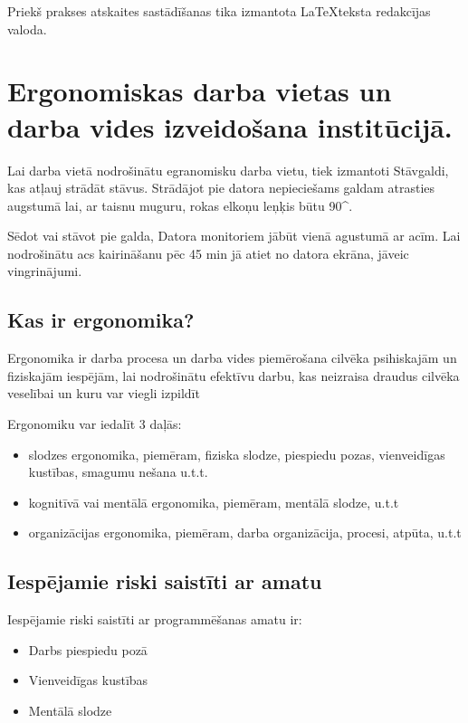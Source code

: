 \documentclass[12pt]{article}
\begin{document}
	Priekš prakses atskaites sastādīšanas tika izmantota \LaTeX\space teksta redakcījas valoda. 
	\pagebreak
	
	
	\section{Ergonomiskas darba vietas un darba vides izveidošana institūcijā.}
	
	Lai darba vietā nodrošinātu egranomisku darba vietu, tiek izmantoti Stāvgaldi, kas atļauj strādāt stāvus. Strādājot pie datora nepieciešams galdam atrasties augstumā lai, ar taisnu muguru, rokas elkoņu leņķis būtu 90^{\circ}.
	
	Sēdot vai stāvot pie galda, Datora monitoriem jābūt vienā agustumā ar acīm. Lai nodrošinātu acs kairināšanu pēc 45 min jā atiet no datora ekrāna, jāveic vingrinājumi.
	
	\subsection{Kas ir ergonomika?}
	Ergonomika ir darba procesa un darba vides piemērošana cilvēka psihiskajām un fiziskajām iespējām, lai
nodrošinātu efektīvu darbu, kas neizraisa draudus cilvēka veselībai un kuru var viegli izpildīt
	
	Ergonomiku var iedalīt 3 daļās:
	\begin{itemize}
		\item slodzes ergonomika, piemēram, fiziska slodze, piespiedu pozas, vienveidīgas kustības, smagumu
nešana u.t.t.
		\item kognitīvā vai mentālā ergonomika, piemēram, mentālā slodze, u.t.t
		\item organizācijas ergonomika, piemēram, darba organizācija, procesi, atpūta, u.t.t
	\end{itemize}
	
	\subsection{Iespējamie riski saistīti ar amatu}
	Iespējamie riski saistīti ar programmēšanas amatu ir:
	\begin{itemize}
		\item Darbs piespiedu pozā
		\item Vienveidīgas kustības
		\item Mentālā slodze
	\end{itemize}
	
	\pagebreak
	
\end{document}
